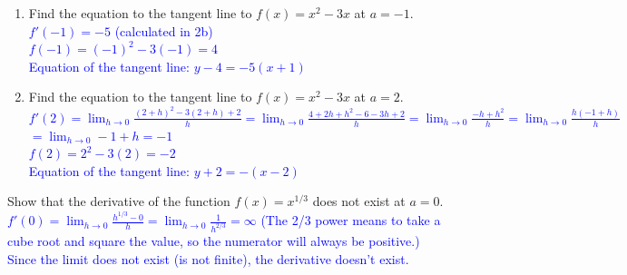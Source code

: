 \documentclass{ximera}
\begin{document}
    \begin{exercise} 
        \begin{enumerate}
            \item Find the equation to the tangent line to $f(x)=x^2-3x$ at $a=-1$.\\
            \textcolor{blue}{$f'(-1)=-5$ (calculated in 2b)\\
                $f(-1)=(-1)^2-3(-1)=4$\\
                Equation of the tangent line: $y-4=-5(x+1)$}
            \item Find the equation to the tangent line to $f(x)=x^2-3x$ at $a=2$.\\
            \textcolor{blue}{$f'(2)=\displaystyle\lim_{h\rightarrow 0}\frac{(2+h)^2-3(2+h)+2}{h}=\lim_{h\rightarrow 0}\frac{4+2h+h^2-6-3h+2}{h}=\lim_{h\rightarrow 0}\frac{-h+h^2}{h}=\lim_{h\rightarrow 0}\frac{h(-1+h)}{h}$\\
            $=\displaystyle \lim_{h\rightarrow 0} -1+h=-1$\\
            $f(2)=2^2-3(2)=-2$\\
            Equation of the tangent line: $y+2=-(x-2)$}
        \end{enumerate}
    \end{exercise}

    \begin{exercise}
        Show that the derivative of the function $f(x)=x^{1/3}$ does not exist at $a=0$.\\
        \textcolor{blue}{$f'(0)=\displaystyle\lim_{h\rightarrow 0} \frac{h^{1/3}-0}{h}=\lim_{h\rightarrow 0}\frac{1}{h^{2/3}}=\infty$ (The 2/3 power means to take a cube root and square the value, so the numerator will always be positive.) \\
        Since the limit does not exist (is not finite), the derivative doesn't exist.}
    \end{exercise}
   
\end{document}

